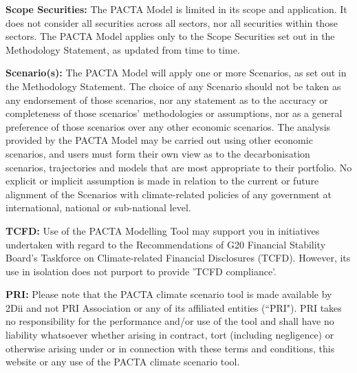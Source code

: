\documentclass[10pt,table,a4]{article}\usepackage[]{graphicx}\usepackage[]{color}
\begin{document}
	\textbf{Scope Securities: }The PACTA Model is limited in its scope and application. It does not consider all securities across all sectors, nor all securities within those sectors. The PACTA Model applies only to the Scope Securities set out in the Methodology Statement, as updated from time to time. 
	
	\textbf{Scenario(s): }The PACTA Model will apply one or more Scenarios, as set out in the Methodology Statement. The choice of any Scenario should not be taken as any endorsement of those scenarios, nor any statement as to the accuracy or completeness of those scenarios' methodologies or assumptions, nor as a general preference of those scenarios over any other economic scenarios. The analysis provided by the PACTA Model may be carried out using other economic scenarios, and users must form their own view as to the decarbonisation scenarios, trajectories and models that are most appropriate to their portfolio. No explicit or implicit assumption is made in relation to the current or future alignment of the Scenarios with climate-related policies of any government at international, national or sub-national level.
	
	\textbf{TCFD: }Use of the PACTA Modelling Tool may support you in initiatives undertaken with regard to the Recommendations of G20 Financial Stability Board's Taskforce on Climate-related Financial Disclosures (TCFD). However, its use in isolation does not purport to provide 'TCFD compliance'. 
	
	
	\textbf{PRI: }Please note that the PACTA climate scenario tool is made available by 2Dii and not PRI Association or any of its affiliated entities (``PRI"). PRI takes no responsibility for the performance and/or use of the tool and shall have no liability whatsoever whether arising in contract, tort (including negligence) or otherwise arising under or in connection with these terms and conditions, this website or any use of the PACTA climate scenario tool.
	
	\newpage
	
\end{document}
